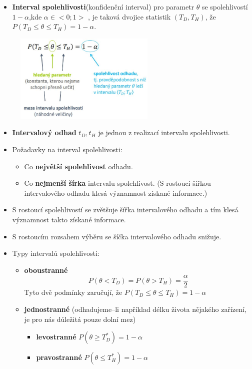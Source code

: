 \begin{itemize}
	\item \textbf{Interval spolehlivosti}(konfidenční interval) pro parametr $\theta$ se spolehlivostí $1−\alpha$,kde $\alpha \in <0; 1>$ , je taková dvojice statistik $(T_D, T_H)$, že $P(T_D \leq \theta \leq T_H) = 1 − \alpha$.
\end{itemize}
\begin{figure}[H]
\centering
\includegraphics[width=0.6\textwidth]{assets/14_inter_odhad_terminologie}
\end{figure}
\begin{itemize}
	\item \textbf{Intervalový odhad} $t_D,t_H$ je jednou z realizací intervalu spolehlivosti.
	\item Požadavky na interval spolehlivosti:
	\begin{itemize}
		\item Co \textbf{největší spolehlivost} odhadu.
		\item Co \textbf{nejmenší šírka} intervalu spolehlivost. (S rostoucí šířkou intervalového odhadu klesá významnost získané informace.)
	\end{itemize}
	\item S rostoucí spolehlivostí se zvětšuje šířka intervalového odhadu a tím klesá významnost takto získané informace.
	\item S rostoucím rozsahem výběru se šíčka intervalového odhadu snižuje.
	\item Typy intervalů spolehlivosti:
	\begin{itemize}
		\item \textbf{oboustranné} 
		\begin{equation*}
				P(\theta < T_D) = P(\theta > T_H) = \frac{\alpha}{2}
		\end{equation*}
		Tyto dvě podmínky zaručují, že $P(T_D \leq \theta \leq T_H) = 1 - \alpha$
		\item \textbf{jednostranné} (odhadujeme--li například délku života nějakého zařízení, je pro nás důležitá pouze dolní mez)
		\begin{itemize}
			\item \textbf{levostranné} $P(\theta \geq T_D^*) = 1 - \alpha$
			\item \textbf{pravostranné} $P(\theta \leq T_H^*) = 1 - \alpha$
		\end{itemize}
	\end{itemize}
\end{itemize}
